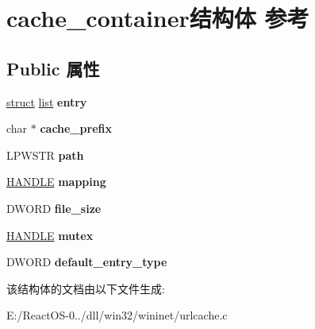 \hypertarget{structcache__container}{}\section{cache\+\_\+container结构体 参考}
\label{structcache__container}
\subsection*{Public 属性}
\begin{DoxyCompactItemize}
\item 
\mbox{\label{structcache__container_a2287f52fa16181579f2f99030f8b1e4d}} 
\hyperlink{interfacestruct}{struct} \hyperlink{classlist}{list} {\bfseries entry}
\item 
\mbox{\label{structcache__container_aecf6c0963cb605b94f612d719752b2f6}} 
char $\ast$ {\bfseries cache\+\_\+prefix}
\item 
\mbox{\label{structcache__container_a6a009bdd3eadee844e129c9e6a43a0f2}} 
L\+P\+W\+S\+TR {\bfseries path}
\item 
\mbox{\label{structcache__container_a39d91d9e31f1cf6568d27362773b16b1}} 
\hyperlink{interfacevoid}{H\+A\+N\+D\+LE} {\bfseries mapping}
\item 
\mbox{\label{structcache__container_aceb56b7b062d8eb31264b591aafb1fd3}} 
D\+W\+O\+RD {\bfseries file\+\_\+size}
\item 
\mbox{\label{structcache__container_a62ba750e906b6815f0a0f6a02f7daff2}} 
\hyperlink{interfacevoid}{H\+A\+N\+D\+LE} {\bfseries mutex}
\item 
\mbox{\label{structcache__container_a4fab5d10b718c99150f89068f8ad8c04}} 
D\+W\+O\+RD {\bfseries default\+\_\+entry\+\_\+type}
\end{DoxyCompactItemize}


该结构体的文档由以下文件生成\+:\begin{DoxyCompactItemize}
\item 
E\+:/\+React\+O\+S-\/0../dll/win32/wininet/urlcache.\+c\end{DoxyCompactItemize}
